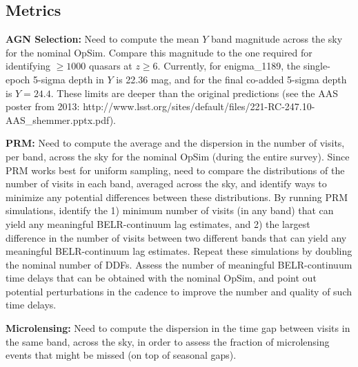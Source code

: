 \subsection{Metrics}
\label{sec:\secname:metrics}


{\bf AGN Selection:} Need to compute the mean $Y$ band magnitude
across the sky for the nominal OpSim. Compare this magnitude to the
one required for identifying $\geq1000$ quasars at $z\geq6$.
Currently, for enigma\_1189, the single-epoch 5-sigma depth in $Y$
is 22.36 mag, and for the final co-added 5-sigma depth is $Y=24.4$.
These limits are deeper than the original predictions (see the AAS
poster from 2013:
http://www.lsst.org/sites/default/files/221-RC-247.10-AAS_shemmer.pptx.pdf).

{\bf PRM:} Need to compute the average and the dispersion in the
number of visits, per band, across the sky for the nominal OpSim
(during the entire survey). Since PRM works best for uniform sampling,
need to compare the distributions of the number of visits in each
band, averaged across the sky, and identify ways to minimize any
potential differences between these distributions. By running PRM
simulations, identify the 1) minimum number of visits (in any band)
that can yield any meaningful BELR-continuum lag estimates, and 2) the
largest difference in the number of visits between two different bands
that can yield any meaningful BELR-continuum lag estimates. Repeat
these simulations by doubling the nominal number of DDFs. Assess the
number of meaningful BELR-continuum time delays that can be obtained
with the nominal OpSim, and point out potential perturbations in the
cadence to improve the number and quality of such time delays.

{\bf Microlensing:} Need to compute the dispersion in the time gap
between visits in the same band, across the sky, in order to assess
the fraction of microlensing events that might be missed (on top of
seasonal gaps).




